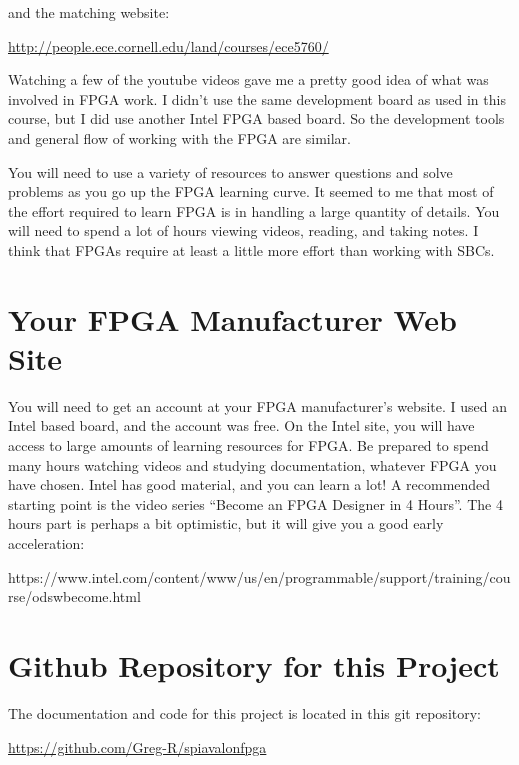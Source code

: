 and the matching website:

\url{http://people.ece.cornell.edu/land/courses/ece5760/}

Watching a few of the youtube videos gave me a pretty good idea of what was involved in FPGA work.
I didn't use the same development board as used in this course, but I did use
another Intel FPGA based board.  So the development tools and general flow of working
with the FPGA are similar.

You will need to use a variety of resources to answer questions and solve problems as you go up the FPGA learning curve.
It seemed to me that most of the effort required to learn FPGA is in handling a large quantity of details.
You will need to spend a lot of hours viewing videos, reading, and taking notes.  I think that FPGAs require at least a little more effort than working with SBCs.

\section{Your FPGA Manufacturer Web Site}

You will need to get an account at your FPGA manufacturer's website.  I used an Intel based board, and the account was free.
On the Intel site, you will have access to large amounts of learning resources for FPGA.
Be prepared to spend many hours watching videos and studying documentation, whatever FPGA you have chosen.
Intel has good material, and you can learn a lot!  A recommended starting point is the video series ``Become an FPGA Designer in 4 Hours''.
The 4 hours part is perhaps a bit optimistic, but it will give you a good early acceleration:

https://www.intel.com/content/www/us/en/programmable/support/training/course/odswbecome.html

\section{Github Repository for this Project}

The documentation and code for this project is located in this git repository:

\url{https://github.com/Greg-R/spiavalonfpga}